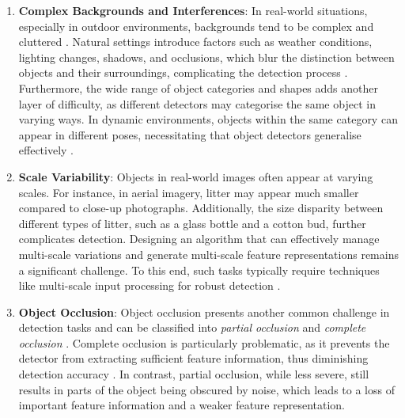 \begin{enumerate}[label=\textbf{\arabic*.}]
    \item \textbf{Complex Backgrounds and Interferences}: In real-world situations, especially in outdoor environments, backgrounds tend to be complex and cluttered \cite{od_survey_problems, od_2}. Natural settings introduce factors such as weather conditions, lighting changes, shadows, and occlusions, which blur the distinction between objects and their surroundings, complicating the detection process \cite{four_pillars_od}. Furthermore, the wide range of object categories and shapes adds another layer of difficulty, as different detectors may categorise the same object in varying ways. In dynamic environments, objects within the same category can appear in different poses, necessitating that object detectors generalise effectively \cite{od_survey_problems}.

    \item \textbf{Scale Variability}: Objects in real-world images often appear at varying scales. For instance, in aerial imagery, litter may appear much smaller compared to close-up photographs. Additionally, the size disparity between different types of litter, such as a glass bottle and a cotton bud, further complicates detection. Designing an algorithm that can effectively manage multi-scale variations and generate multi-scale feature representations remains a significant challenge. To this end, such tasks typically require techniques like multi-scale input processing for robust detection \cite{od_survey_problems, four_pillars_od}.

    \item \textbf{Object Occlusion}: Object occlusion presents another common challenge in detection tasks and can be classified into \textit{partial occlusion} and \textit{complete occlusion} \cite{od_survey_problems, od_problem, survey_od_2}. Complete occlusion is particularly problematic, as it prevents the detector from extracting sufficient feature information, thus diminishing detection accuracy \cite{od_survey_problems}. In contrast, partial occlusion, while less severe, still results in parts of the object being obscured by noise, which leads to a loss of important feature information and a weaker feature representation.



\end{enumerate}
